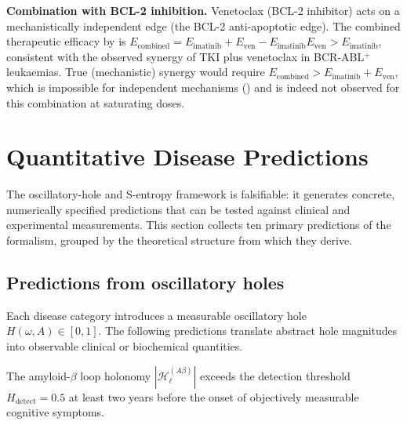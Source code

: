 \begin{example}
\textbf{Combination with BCL-2 inhibition.}  Venetoclax (BCL-2 inhibitor)
acts on a mechanistically independent edge (the BCL-2 anti-apoptotic edge).
The combined therapeutic efficacy by  is
$E_{\mathrm{combined}} = E_{\mathrm{imatinib}} + E_{\mathrm{ven}} - E_{\mathrm{imatinib}} E_{\mathrm{ven}} > E_{\mathrm{imatinib}}$,
consistent with the observed synergy of TKI plus venetoclax in BCR-ABL$^+$
leukaemias.  True (mechanistic) synergy would require $E_{\mathrm{combined}} >
E_{\mathrm{imatinib}} + E_{\mathrm{ven}}$, which is impossible for independent
mechanisms () and is indeed not observed for this
combination at saturating doses.
\end{example}

\section{Quantitative Disease Predictions}
\label{sec:ch07-quantitative-predictions}

The oscillatory-hole and S-entropy framework is falsifiable: it generates
concrete, numerically specified predictions that can be tested against
clinical and experimental measurements.  This section collects ten
primary predictions of the formalism, grouped by the theoretical structure
from which they derive.

\subsection{Predictions from oscillatory holes}
\label{sec:ch07-pred-holes}

Each disease category introduces a measurable oscillatory hole
$H(\omega, A) \in [0,1]$.  The following predictions translate abstract
hole magnitudes into observable clinical or biochemical quantities.

\begin{theorem}
\label{thm:ch07-P1}
The amyloid-$\beta$ loop holonomy $|\mathcal{H}_\ell^{(A\beta)}|$ exceeds
the detection threshold $H_{\mathrm{detect}} = 0.5$ at least two years before
the onset of objectively measurable cognitive symptoms.
\end{theorem}

